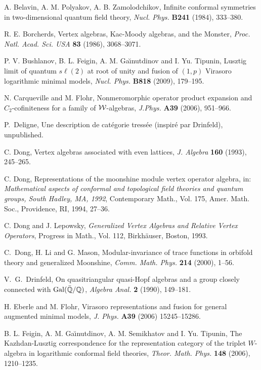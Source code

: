 \documentclass[12pt]{article}
\begin{document}
\begin{thebibliography}{FGST2}
 A. Belavin, A. M. Polyakov, A. B. Zamolodchikov,
Infinite conformal symmetries in two-dimensional quantum field theory,
{\it Nucl. Phys.} {\bf B241} (1984), 333--380.

 R. E. Borcherds, Vertex algebras, Kac-Moody algebras,
and the Monster, {\em Proc. Natl. Acad. Sci. USA} {\bf 83} (1986), 
3068--3071.

P. V. Bushlanov, B. L. Feigin, A. M. Ga{\u\i}nutdinov and
I. Yu. Tipunin, Lusztig limit of quantum $s\ell(2)$ at root of unity
and fusion of $(1,p)$ Virasoro logarithmic minimal models, {\em
Nucl. Phys.} {\bf B818} (2009), 179--195.

N. Carqueville and M. Flohr, Nonmeromorphic operator product expansion
and $C_2$-cofiniteness for a family of $\cal{W}$-algebras,
{\em J.Phys.} {\bf A39} (2006), 951--966.

P.~Deligne, Une description de cat\'{e}gorie tress\'{e}e (inspir\'{e}
par Drinfeld), unpublished.

 C. Dong, Vertex algebras associated with
even lattices, {\it J. Algebra} {\bf 160} (1993), 245--265.

 C. Dong, Representations of the moonshine module
vertex operator algebra, in: {\em Mathematical aspects of conformal
and topological field theories and quantum groups, South Hadley, MA,
1992}, Contemporary Math., Vol. 175, Amer. Math. Soc., Providence,
RI, 1994, 27--36.

 C. Dong and J. Lepowsky, {\em Generalized Vertex
Algebras and Relative Vertex Operators}, Progress in Math., Vol. 112,
Birkh\"{a}user, Boston, 1993.

C.~Dong, H. Li and G. Mason, Modular-invariance of trace 
functions in orbifold theory and generalized Moonshine, 
{\it Comm. Math. Phys.} {\bf 214} (2000),  1--56.

V.~G.~Drinfeld,
On quasitriangular quasi-Hopf algebras and a group closely connected
with
${\rm Gal}({\bar{\mathbb Q}}/{\mathbb Q})$,
{\em Algebra Anal.} {\bf 2} (1990), 149--181.

H. Eberle and M. Flohr, 
Virasoro representations and fusion for general augmented minimal models,
{\it J. Phys.} {\bf A39} (2006) 15245--15286.

B. L. Feigin, A. M. Ga{\u\i}nutdinov, 
A. M. Semikhatov and I. Yu. Tipunin, 
The Kazhdan-Lusztig correspondence for the representation category
of the triplet $W$-algebra in logarithmic conformal field theories,
{\em Theor. Math. Phys.} {\bf 148} (2006), 1210--1235.


\end{thebibliography}
\end{document}
